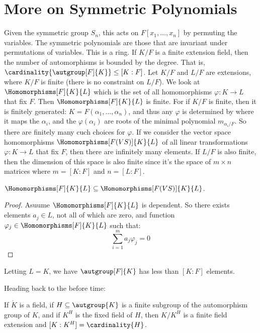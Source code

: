 \documentclass{article}                                                        %
\begin{document}
    \section{More on Symmetric Polynomials}
        Given the symmetric group $S_{n}$, this acts on $F[x_{1},\dots,x_{n}]$
        by permuting the variables. The symmetric polynomials are those that are
        invariant under permutations of variables. This is a ring.
        If $K/F$ is a finite extension field, then the number of automorphisms
        is bounded by the degree. That is,
        $\cardinality{\autgroup[F]{K}}\leq[K:F]$. Let $K/F$ and $L/F$ are
        extensions, where $K/F$ is finite (there is no constraint on $L/F$). We
        look at $\Homomorphisms[F]{K}{L}$ which is the set of all homomorphisms
        $\varphi:K\rightarrow{L}$ that fix $F$. Then $\Homomorphisms[F]{K}{L}$
        is finite. For if $K/F$ is finite, then it is finitely generated:
        $K=F(\alpha_{1},\dots,\alpha_{n})$, and thus any $\varphi$ is determined
        by where it maps the $\alpha_{i}$, and the $\varphi(\alpha_{i})$ are
        roots of the minimal polynomial $m_{\alpha_{i}/F}$. So there are
        finitely many cuch choices for $\varphi$. If we consider the vector
        space homomorphisms $\Homomorphisms[F(VS)]{K}{L}$ of all linear
        transformations $\varphi:K\rightarrow{L}$ that fix $F$, then there are
        infinitely many elements. If $L/F$ is also finite, then the dimension
        of this space is also finite since it's the space of $m\times{n}$
        matrices where $m=[K:F]$ and $n=[L:F]$.
        \begin{theorem}
            $\Homomorphisms[F]{K}{L}\subseteq\Homomorphisms[F(VS)]{K}{L}$.
        \end{theorem}
        \begin{proof}
            Asuume $\Homomorphisms[F]{K}{L}$ is dependent. So there exists
            elements $a_{j}\in{L}$, not all of which are zero, and function
            $\varphi_{j}\in\Homomorphisms[F]{K}{L}$ such that:
            \begin{equation}
                \sum_{i=1}^{m}a_{j}\varphi_{j}=0
            \end{equation}
        \end{proof}
        \begin{theorem}
            Letting $L=K$, we have $\autgroup[F]{K}$ has less than $[K:F]$
            elements.
        \end{theorem}
        Heading back to the before time:
        \begin{theorem}
            If $\ring{K}$ is a field, if $H\subseteq\autgroup{K}$ is a finite
            subgroup of the automorphism group of $K$, and if $K^{H}$ is the
            fixed field of $H$, then $K/K^{H}$ is a finite field extension and
            $[K:K^{H}]=\cardinality{H}$.
        \end{theorem}
\end{document}
